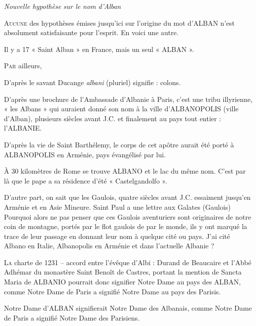 
\begin{center}
  {\Large\itshape Nouvelle hypothèse sur le nom d’Alban}
\end{center}
\vspace{1.2em}

\noindent
\lettrine{A}{ucune} des hypothèses émises jusqu’ici sur l’origine du mot d’ALBAN n’est absolument satisfaisante pour l’esprit. En voici une autre.

Il y a 17 « Saint Alban » en France, mais un seul « ALBAN ».

\medskip

\noindent
\lettrine{P}{ar} ailleurs,

\medskip

\hspace*{1.5em}D’après le savant Ducange \textit{albani} (pluriel) signifie : colons.

\hspace*{1.5em}D’après une brochure de l’Ambassade d’Albanie à Paris, c’est une tribu illyrienne, « les Albans » qui auraient donné son nom à la ville d’ALBANOPOLIS (ville d’Alban), plusieurs siècles avant J.C. et finalement au pays tout entier : l’ALBANIE.

\hspace*{1.5em}D’après la vie de Saint Barthélemy, le corps de cet apôtre aurait été porté à ALBANOPOLIS en Arménie, pays évangélisé par lui.

\hspace*{1.5em}À 30 kilomètres de Rome se trouve ALBANO et le lac du même nom. C’est par là que le pape a sa résidence d’été « Castelgandolfo ».

\hspace*{1.5em}D’autre part, on sait que les Gaulois, quatre siècles avant J.C. essaiment jusqu’en Arménie et en Asie Mineure. Saint Paul a une lettre aux Galates (Gaulois) Pourquoi alors ne pas penser que ces Gaulois aventuriers sont originaires de notre coin de montagne, portés par le flot gaulois de par le monde, ils y ont marqué la trace de leur passage en donnant leur nom à quelque cité ou pays. J’ai cité Albano en Italie, Albanopolis en Arménie et dans l’actuelle Albanie ?

\medskip

\noindent
\lettrine{L}{a} charte de 1231 – accord entre l’évêque d’Albi : Durand de Beaucaire et l’Abbé Adhémar du monastère Saint Benoît de Castres, portant la mention de Sancta Maria de ALBANIO pourrait donc signifier Notre Dame au pays des ALBAN, comme Notre Dame de Paris a signifié Notre Dame au pays des Parisis.

Notre Dame d’ALBAN signifierait Notre Dame des Albanais, comme Notre Dame de Paris a signifié Notre Dame des Parisiens.
